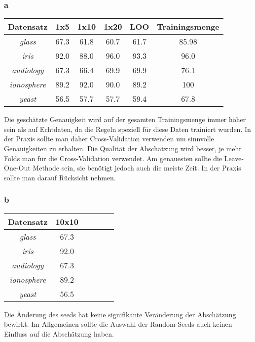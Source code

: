 \subsubsection*{a}
\begin{tabular}{c|c|c|c|c|c}
				Datensatz         & 1x5  & 1x10 & 1x20 & LOO  & Trainingsmenge   \\ \hline
				\emph{glass}      & 67.3 & 61.8 & 60.7 & 61.7 & 85.98   \\ \hline
				\emph{iris}       & 92.0 & 88.0 & 96.0 & 93.3 & 96.0    \\ \hline
				\emph{audiology}  & 67.3 & 66.4 & 69.9 & 69.9 & 76.1    \\ \hline
				\emph{ionosphere} & 89.2 & 92.0 & 90.0 & 89.2 & 100   \\ \hline
				\emph{yeast}      & 56.5 & 57.7 & 57.7 & 59.4 & 67.8   \\ \hline
\end{tabular}

Die gesch\"atzte Genauigkeit wird auf der gesamten Trainingsmenge immer h\"oher sein als auf Echtdaten, da die Regeln speziell f\"ur diese Daten trainiert wurden. In der Praxis sollte man daher Cross-Validation verwenden um sinnvolle Genauigkeiten zu erhalten. Die Qualit\"at der Absch\"atzung wird besser, je mehr Folds man f\"ur die Cross-Validation verwendet. Am genauesten sollte die Leave-One-Out Methode sein, sie ben\"otigt jedoch auch die meiste Zeit. In der Praxis sollte man darauf R\"ucksicht nehmen.

\subsubsection*{b}
\begin{tabular}{c|c|c|c|c|c}
				Datensatz         & 10x10    \\ \hline
				\emph{glass}      & 67.3     \\ \hline
				\emph{iris}       & 92.0     \\ \hline
				\emph{audiology}  & 67.3     \\ \hline
				\emph{ionosphere} & 89.2     \\ \hline
				\emph{yeast}      & 56.5     \\ \hline
\end{tabular}

Die \"Anderung des seeds hat keine signifikante Ver\"anderung der Absch\"atzung bewirkt. Im Allgemeinen sollte die Auswahl der Random-Seeds auch keinen Einfluss auf die Absch\"atzung haben.


